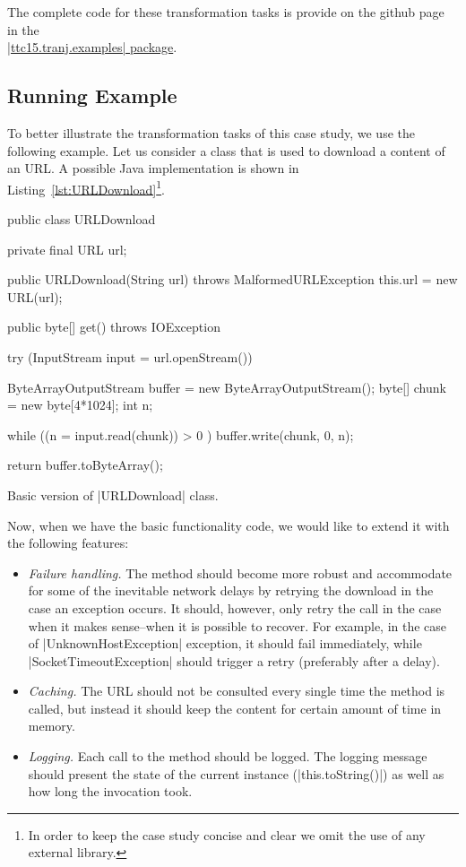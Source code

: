 The complete code for these transformation tasks is provide on the github page in the\\ \href{https://github.com/fikovnik/ttc15-tranj-case/tree/master/src/ttc15-tranj/src/main/java/ttc15/tranj/examples}{\javainline|ttc15.tranj.examples| package}.

\subsection{Running Example}

To better illustrate the transformation tasks of this case study, we use the following example.
Let us consider a class that is used to download a content of an URL.
A possible Java implementation is shown in Listing~\ref{lst:URLDownload}\footnote{In order to keep the case study concise and clear we omit the use of any external library.}.

\begin{listing}[H]
  \begin{javacode}
  public class URLDownload {
    private final URL url;

    public URLDownload(String url) throws MalformedURLException {
      this.url = new URL(url);
    }

    public byte[] get() throws IOException {
      try (InputStream input = url.openStream()) {

        ByteArrayOutputStream buffer = new ByteArrayOutputStream();
        byte[] chunk = new byte[4*1024];
        int n;

        while ((n = input.read(chunk)) > 0 ) {
          buffer.write(chunk, 0, n);
        }

        return buffer.toByteArray();
      }
    }
  }
  \end{javacode}
  \caption{Basic version of \javainline|URLDownload| class.}
  \label{lst:URLDownload}
\end{listing}

Now, when we have the basic functionality code, we would like to extend it with the following features:

\begin{itemize}[--]
   \item \emph{Failure handling.} The method should become more robust and accommodate for some of the inevitable network delays by retrying the download in the case an exception occurs.
   It should, however, only retry the call in the case when it makes sense--\Ie when it is possible to recover.
   For example, in the case of \javainline|UnknownHostException| exception, it should fail immediately, while \javainline|SocketTimeoutException| should trigger a retry (preferably after a delay).
   \item \emph{Caching.} The URL should not be consulted every single time the method is called, but instead it should keep the content for certain amount of time in memory.
   \item \emph{Logging.} Each call to the method should be logged.
   The logging message should present the state of the current instance (\javainline|this.toString()|) as well as how long the invocation took.
\end{itemize} 

